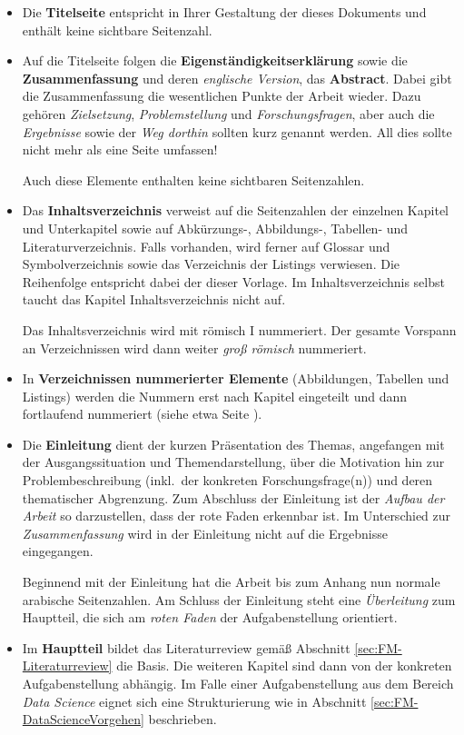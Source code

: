 \begin{itemize}[$\star$]
\item Die \textbf{Titelseite} entspricht in Ihrer Gestaltung der dieses Dokuments und enthält keine sichtbare
  Seitenzahl.
\item Auf die Titelseite folgen die \textbf{Eigenständigkeitserklärung} sowie die \textbf{Zusammenfassung} und
  deren \emph{englische Version}, das \textbf{Abstract}. Dabei gibt die Zusammenfassung die wesentlichen Punkte
  der Arbeit wieder. Dazu gehören \emph{Zielsetzung}, \emph{Problemstellung} und \emph{Forschungsfragen}, aber
  auch die \emph{Ergebnisse} sowie der \emph{Weg dorthin} sollten kurz genannt werden. All dies sollte nicht
  mehr als eine Seite umfassen!
  
  Auch diese Elemente enthalten keine sichtbaren  Seitenzahlen.
\item Das \textbf{Inhaltsverzeichnis} verweist auf die Seitenzahlen der einzelnen Kapitel und Unterkapitel
  sowie auf Abkürzungs-, Abbildungs-, Tabellen- und Literaturverzeichnis. Falls vorhanden, wird ferner auf
  Glossar und Symbolverzeichnis sowie das Verzeichnis der Listings verwiesen. Die Reihenfolge entspricht dabei
  der dieser Vorlage. Im Inhaltsverzeichnis selbst taucht das Kapitel Inhaltsverzeichnis nicht auf.
  
  Das Inhaltsverzeichnis wird mit römisch I nummeriert. Der gesamte Vorspann an Verzeichnissen wird dann
  weiter \emph{groß römisch} nummeriert.
\item In \textbf{Verzeichnissen nummerierter Elemente} (Abbildungen, Tabellen und Listings) werden die Nummern
  erst nach Kapitel eingeteilt und dann fortlaufend nummeriert (siehe etwa Seite \pageref{listoffigures}).
\item Die \textbf{Einleitung} dient der kurzen Präsentation des Themas, angefangen mit der Ausgangssituation
  und Themendarstellung, über die Motivation hin zur Problembeschreibung (inkl.~der konkreten Forschungsfrage(n))
  und deren thematischer Abgrenzung. Zum Abschluss der Einleitung ist der \emph{Aufbau der Arbeit} so
  darzustellen, dass der rote Faden erkennbar ist. Im Unterschied zur \emph{Zusammenfassung} wird in der
  Einleitung nicht auf die Ergebnisse eingegangen.
  
  Beginnend mit der Einleitung hat die Arbeit bis zum Anhang nun normale arabische Seitenzahlen. Am Schluss der
  Einleitung steht eine \emph{Überleitung} zum Hauptteil, die sich am \emph{roten Faden} der Aufgabenstellung
  orientiert.
\item Im \textbf{Hauptteil} bildet das Literaturreview gemäß Abschnitt \ref{sec:FM-Literaturreview} die Basis.
  Die weiteren Kapitel sind dann von der konkreten Aufgabenstellung abhängig. Im Falle einer Aufgabenstellung
  aus dem Bereich \emph{Data Science} eignet sich eine Strukturierung wie in Abschnitt 
  \ref{sec:FM-DataScienceVorgehen} beschrieben.
  

\end{itemize}
